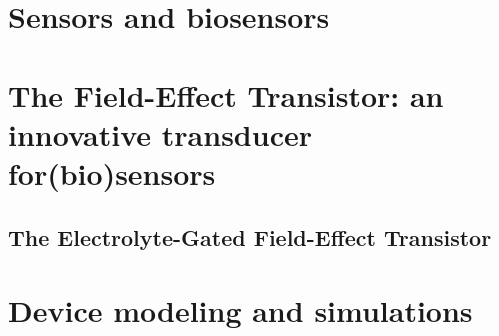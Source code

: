 \section{Sensors and biosensors}
\label{sec:sensors}

%


\section{The Field-Effect Transistor: an innovative transducer for(bio)sensors}
\label{sec:FET}

%


\subsection{The Electrolyte-Gated Field-Effect Transistor}
\label{sec:EGFET}

%


\section{Device modeling and simulations}
\label{sec:simulations}




\newpage
\thispagestyle{empty}
\ %
\newpage
